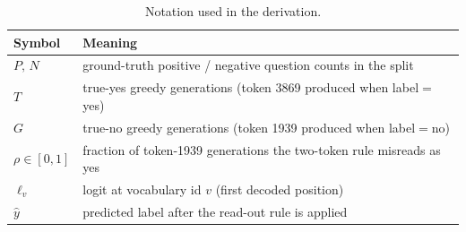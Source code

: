 \documentclass[11pt,letterpaper]{article}
\begin{document}
\begin{table}[h]
\caption{Notation used in the derivation.}
\label{tab:notation}
\centering
\small
\begin{tabular}{ll}
\toprule
Symbol & Meaning \\
\midrule
$P,\,N$           & ground-truth positive / negative question counts in the split \\
$T$               & true-yes greedy generations (token 3869 produced when label$=$yes) \\
$G$               & true-no  greedy generations (token 1939 produced when label$=$no) \\
$\rho\in[0,1]$    & fraction of token-1939 generations the two-token rule misreads as yes \\
$\ell_v$          & logit at vocabulary id $v$ (first decoded position) \\
$\hat{y}$         & predicted label after the read-out rule is applied \\
\bottomrule
\end{tabular}
\end{table}
\end{document}
